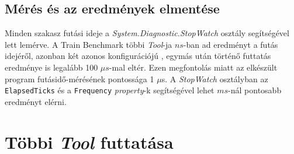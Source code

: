 \subsection{Mérés és az eredmények elmentése}

Minden szakasz futási ideje a \emph{System.Diagnostic.StopWatch} osztály segítségével lett lemérve. A Train Benchmark többi \emph{Tool}-ja $ns$-ban ad eredményt a futás idejéről, azonban két azonos konfigurációjú , egymás után történő futtatás eredménye is legalább 100 $\mu{}s$-mal eltér. Ezen megfontolás miatt az elkészült program futásidő-mérésének pontossága 1 $\mu{}$s. A \emph{StopWatch} osztályban az \texttt{ElapsedTicks} és a \texttt{Frequency} \emph{property}-k segítségével lehet $ms$-nál pontosabb eredményt elérni. 

\section{Többi \emph{Tool} futtatása}
